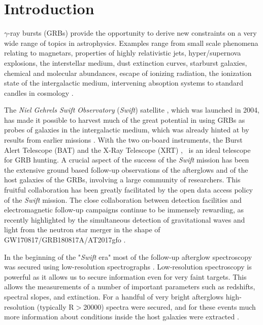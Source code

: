 \documentclass{aa}    %
\begin{document}
\maketitle

\section{Introduction}

$\gamma$-ray bursts (GRBs) provide the opportunity to derive new constraints on
a very wide range of topics in astrophysics. Examples range from small scale
phenomena relating to magnetars, properties of highly relativistic jets,
hyper/supernova explosions, the interstellar medium, dust extinction curves,
starburst galaxies, chemical and molecular abundances, escape of ionizing
radiation, the ionization state of the intergalactic medium, intervening
absoption systems to standard candles in cosmology \citep[e.g.,][]{Lyons2010,
	Molinari2007, HjorthBloom2012, Wijers1998, Prochaska2009, Savaglio2006,
	Ghirlanda2007, Vergani2009, Christensen2017}.

The \textit{Niel Gehrels Swift Observatory} ({\it Swift}) satellite
\citep{Gehrels2004, Gehrels2009}, which was launched in 2004, has made it
possible to harvest much of the great potential in using GRBs as probes of
galaxies in the intergalactic medium, which was already hinted at by results
from earlier missions \citep[e.g.,][]{VanParadijs2000, Ricker2004}. With the two
on-board instruments, the Burst Alert Telescope (BAT) \citep{Barthelmy2005} and
the X-Ray Telescope (XRT) \citep{Burrows2005}, \swift~is an ideal telescope for
GRB hunting. A crucial aspect of the success of the {\it Swift} mission has been
the extensive ground based follow-up observations of the afterglows and of the
host galaxies of the GRBs, involving a large community of researchers. This
fruitful collaboration has been greatly facilitated by the open data access
policy of the {\it Swift} mission. The close collaboration between detection
facilities and electromagnetic  follow-up campaigns continue to be immensely
rewarding, as recently highlighted by the simultaneous detection of
gravitational waves and light from the neutron star merger in the shape of
GW170817/GRB180817A/AT2017gfo \citep{LIGOScientificCollaboration2017a,
	LIGOScientificCollaboration2017}.

In the beginning of the "{\it Swift} era" most of the follow-up afterglow
spectroscopy was secured using low-resolution spectrographs \citep[typically
R=$\lambda/\Delta\lambda$$<$1000, e.g.][]{Fynbo2009}. Low-resolution
spectroscopy is powerful as it allows us to secure information even for very faint
targets. This allows the measurements of a number of important parameters such
as redshifts, spectral slopes, and extinction. For a handful of very bright
afterglows high-resolution (typically R$>$20000) spectra were secured, and for
these events much more information about conditions inside the host galaxies
were extracted \citep[e.g.,][]{Fiore2005, Thone2007, Prochaska2007,
	Vreeswijk2007, Castro-Tirado2010}.
\end{document}
